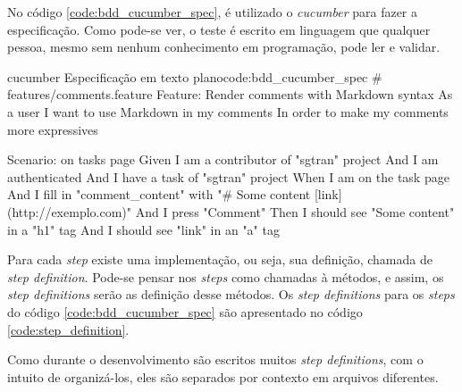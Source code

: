 No código \ref{code:bdd_cucumber_spec}, é utilizado o \textit{cucumber} para fazer a especificação. Como pode-se ver, o teste é escrito em linguagem que qualquer pessoa, mesmo sem nenhum conhecimento em programação, pode ler e validar.

\begin{mycode}{cucumber}%
{Especificação em texto plano}{code:bdd_cucumber_spec}
# features/comments.feature
Feature: Render comments with Markdown syntax
  As a user
  I want to use Markdown in my comments
  In order to make my comments more expressives

  Scenario: on tasks page
    Given I am a contributor of "sgtran" project
    And I am authenticated
    And I have a task of "sgtran" project
    When I am on the task page
    And I fill in "comment_content" with "# Some content [link](http://exemplo.com)"
    And I press "Comment"
    Then I should see "Some content" in a "h1" tag
    And I should see "link" in an "a" tag
\end{mycode}

Para cada \textit{step} existe uma implementação, ou seja, sua definição, chamada de \textit{step definition}. Pode-se pensar nos \textit{steps} como chamadas à métodos, e assim, os \textit{step definitions} serão as definição desse métodos. Os \textit{step definitions} para os \textit{steps} do código \ref{code:bdd_cucumber_spec} são apresentado no código \ref{code:step_definition}.

Como durante o desenvolvimento são escritos muitos \textit{step definitions}, com o intuito de organizá-los, eles são separados por contexto em arquivos diferentes.


